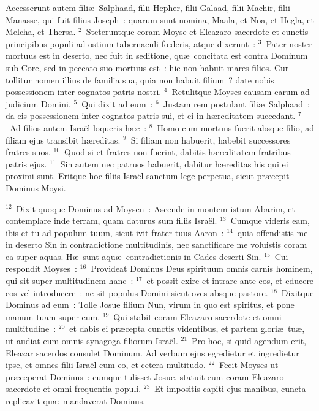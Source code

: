 \lettrine[lines=3,image=true,loversize=0.05,lraise=-0.03]{A}{}ccesserunt autem fili\ae\ Salphaad, filii Hepher, filii Galaad, filii Machir, filii Manasse, qui fuit filius Joseph~: quarum sunt nomina, Maala, et Noa, et Hegla, et Melcha, et Thersa.
${}^{2}$~Steteruntque coram Moyse et Eleazaro sacerdote et cunctis principibus populi ad ostium tabernaculi fœderis, atque dixerunt~:
${}^{3}$~Pater noster mortuus est in deserto, nec fuit in seditione, qu\ae\ concitata est contra Dominum sub Core, sed in peccato suo mortuus est~: hic non habuit mares filios. Cur tollitur nomen illius de familia sua, quia non habuit filium~? date nobis possessionem inter cognatos patris nostri.
${}^{4}$~Retulitque Moyses causam earum ad judicium Domini.
${}^{5}$~Qui dixit ad eum~:
${}^{6}$~Justam rem postulant fili\ae\ Salphaad~: da eis possessionem inter cognatos patris sui, et ei in h\ae reditatem succedant.
${}^{7}$~Ad filios autem Isra\"el loqueris h\ae c~:
${}^{8}$~Homo cum mortuus fuerit absque filio, ad filiam ejus transibit h\ae reditas.
${}^{9}$~Si filiam non habuerit, habebit successores fratres suos.
${}^{10}$~Quod si et fratres non fuerint, dabitis h\ae reditatem fratribus patris ejus.
${}^{11}$~Sin autem nec patruos habuerit, dabitur h\ae reditas his qui ei proximi sunt. Eritque hoc filiis Isra\"el sanctum lege perpetua, sicut pr\ae cepit Dominus Moysi.


${}^{12}$~Dixit quoque Dominus ad Moysen~: Ascende in montem istum Abarim, et contemplare inde terram, quam daturus sum filiis Isra\"el.
${}^{13}$~Cumque videris eam, ibis et tu ad populum tuum, sicut ivit frater tuus Aaron~:
${}^{14}$~quia offendistis me in deserto Sin in contradictione multitudinis, nec sanctificare me voluistis coram ea super aquas. H\ae\ sunt aqu\ae\ contradictionis in Cades deserti Sin.
${}^{15}$~Cui respondit Moyses~:
${}^{16}$~Provideat Dominus Deus spirituum omnis carnis hominem, qui sit super multitudinem hanc~:
${}^{17}$~et possit exire et intrare ante eos, et educere eos vel introducere~: ne sit populus Domini sicut oves absque pastore.
${}^{18}$~Dixitque Dominus ad eum~: Tolle Josue filium Nun, virum in quo est spiritus, et pone manum tuam super eum.
${}^{19}$~Qui stabit coram Eleazaro sacerdote et omni multitudine~:
${}^{20}$~et dabis ei pr\ae cepta cunctis videntibus, et partem glori\ae\ tu\ae , ut audiat eum omnis synagoga filiorum Isra\"el.
${}^{21}$~Pro hoc, si quid agendum erit, Eleazar sacerdos consulet Dominum. Ad verbum ejus egredietur et ingredietur ipse, et omnes filii Isra\"el cum eo, et cetera multitudo.
${}^{22}$~Fecit Moyses ut pr\ae ceperat Dominus~: cumque tulisset Josue, statuit eum coram Eleazaro sacerdote et omni frequentia populi.
${}^{23}$~Et impositis capiti ejus manibus, cuncta replicavit qu\ae\ mandaverat Dominus.

